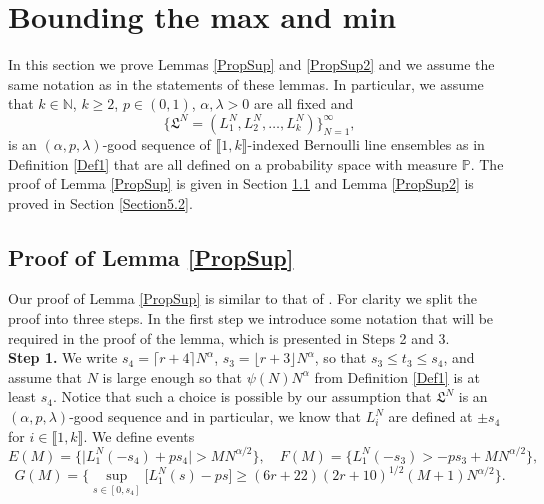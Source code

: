 %
\section{Bounding the max and min}\label{Section5}

In this section we prove Lemmas \ref{PropSup} and \ref{PropSup2} and we assume the same notation as in the statements of these lemmas. In particular, we assume that $k \in \mathbb{N}$, $k \geq 2$, $p \in (0,1)$, $\alpha, \lambda > 0$ are all fixed and 
\begin{equation*}
	\big\{\mathfrak{L}^N = (L^N_1,L^N_2, \dots, L^N_k)\big\}_{N=1}^{\infty},
\end{equation*}
is an $(\alpha,p,\lambda)$-good sequence of $\llbracket 1, k\rrbracket$-indexed Bernoulli line ensembles as in Definition \ref{Def1} that are all defined on a probability space with measure $\mathbb{P}$. The proof of Lemma \ref{PropSup} is given in Section \ref{Section5.1} and Lemma \ref{PropSup2} is proved in Section \ref{Section5.2}.


%
\subsection{Proof of Lemma \ref{PropSup}}\label{Section5.1}

Our proof of Lemma \ref{PropSup} is similar to that of \cite[Lemma 5.2]{CD}. For clarity we split the proof into three steps. In the first step we introduce some notation that will be required in the proof of the lemma, which is presented in Steps 2 and 3. \\

{\bf \raggedleft Step 1.} We write $s_4 = \lceil r+4 \rceil N^\alpha$, $s_3 = \lfloor r+3 \rfloor N^\alpha$, so that $s_3 \leq t_3 \leq s_4$, and assume that $N$ is large enough so that $\psi(N)N^{\alpha}$ from Definition \ref{Def1} is at least $s_4$. Notice that such a choice is possible by our assumption that $\mathfrak{L}^N$ is an $(\alpha,p,\lambda)$-good sequence and in particular, we know that $L_i^N$ are defined at $\pm s_4$ for $i \in \llbracket 1, k \rrbracket$. We define events 
$$E(M) = \Big\{\big|L_1^N(-s_4) + ps_4\big| > MN^{\alpha/2}\Big\}, \quad F(M) = \Big\{L_1^N(-s_3) > -ps_3 + MN^{\alpha/2} \Big\},$$
$$G(M) = \Bigg\{\sup_{s\in[0,s_4]} \big[L_1^N(s) - ps \big] \geq (6r+22)(2r+10)^{1/2}(M+1)N^{\alpha/2} \Bigg\}.$$


